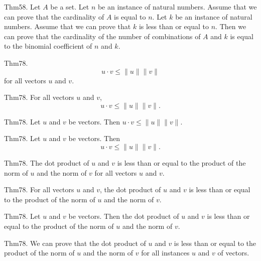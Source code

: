 \documentclass{article}
\begin{document}
Thm58. Let $A$ be a set. Let $n$ be an instance of natural numbers. Assume that we can prove that the cardinality of $A$ is equal to $n$. Let $k$ be an instance of natural numbers. Assume that we can prove that $k$ is less than or equal to $n$. Then we can prove that the cardinality of the number of combinations of $A$ and $k$ is equal to the binomial coefficient of $n$ and $k$.

Thm78. $$u \cdot v \leq \| u \| \| v \|$$ for all vectors $u$ and $v$.

Thm78. For all vectors $u$ and $v$, $$u \cdot v \leq \| u \| \| v \|.$$

Thm78. Let $u$ and $v$ be vectors. Then $u \cdot v \leq \| u \| \| v \|$.

Thm78. Let $u$ and $v$ be vectors. Then $$u \cdot v \leq \| u \| \| v \|.$$

Thm78. The dot product of $u$ and $v$ is less than or equal to the product of the norm of $u$ and the norm of $v$ for all vectors $u$ and $v$.

Thm78. For all vectors $u$ and $v$, the dot product of $u$ and $v$ is less than or equal to the product of the norm of $u$ and the norm of $v$.

Thm78. Let $u$ and $v$ be vectors. Then the dot product of $u$ and $v$ is less than or equal to the product of the norm of $u$ and the norm of $v$.

Thm78. We can prove that the dot product of $u$ and $v$ is less than or equal to the product of the norm of $u$ and the norm of $v$ for all instances $u$ and $v$ of vectors.
\end{document}
